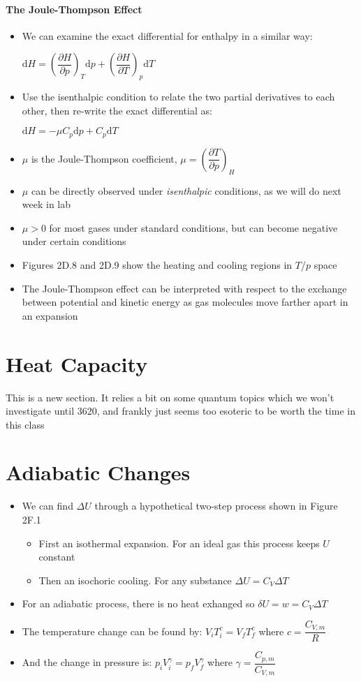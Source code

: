 \documentclass[12pt, openany, letterpaper]{memoir}
\begin{document}
\paragraph{The Joule-Thompson Effect}
\begin{itemize}
	\item We can examine the exact differential for enthalpy in a similar way: 
	
	$\mathrm{d}H = \left(\dfrac{\partial H}{\partial p}\right)_T\mathrm{d}p + \left(\dfrac{\partial H}{\partial T}\right)_p\mathrm{d}T$
	\item Use the isenthalpic condition to relate the two partial derivatives to each other, then re-write the exact differential as:
	
	$\mathrm{d}H = -\mu C_p\mathrm{d}p + C_p\mathrm{d}T$ 
	\item $\mu$ is the Joule-Thompson coefficient, $\mu = \left(\dfrac{\partial T}{\partial p}\right)_H$
	\item $\mu$ can be directly observed under \emph{isenthalpic} conditions, as we will do next week in lab
	\item $\mu > 0$ for most gases under standard conditions, but can become negative under certain conditions
	\item Figures 2D.8 and 2D.9 show the heating and cooling regions in $T$/$p$ space
	\item The Joule-Thompson effect can be interpreted with respect to the exchange between potential and kinetic energy as gas molecules move farther apart in an expansion
\end{itemize}

\section{Heat Capacity}

This is a new section. It relies a bit on some quantum topics which we won't investigate until 3620, and frankly just seems too esoteric to be worth the time in this class

\section{Adiabatic Changes}
\begin{itemize}	
	\item We can find $\Delta U$ through a hypothetical two-step process shown in Figure 2F.1
	\begin{itemize}
		\item First an isothermal expansion. For an ideal gas this process keeps $U$ constant
		\item Then an isochoric cooling. For any substance $\Delta U = C_V\Delta T$
	\end{itemize}
	\item For an adiabatic process, there is no heat exhanged so $\delta U = w = C_V\Delta T$
	\item The temperature change can be found by: $V_iT_i^c = V_fT_f^c$ where $c=\dfrac{C_{V,m}}{R}$
	\item And the change in pressure is: $p_iV_i^\gamma=p_fV_f^\gamma$ where $\gamma = \dfrac{C_{p,m}}{C_{V,m}}$
\end{itemize}
\end{document}
